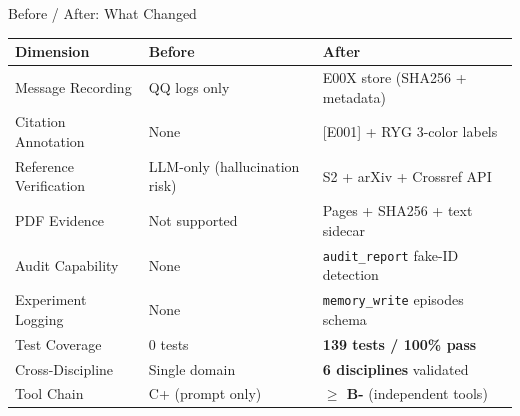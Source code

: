 \documentclass[aspectratio=169,11pt]{beamer}
\begin{document}
\begin{frame}{Before / After: What Changed}
  \begin{table}[h]
    \small
    \begin{tabular}{p{3.5cm}p{4.2cm}p{5.5cm}}
      \toprule
      Dimension & Before & After \\
      \midrule
      Message Recording & QQ logs only & E00X store (SHA256 + metadata) \\
      Citation Annotation & None & [E001] + RYG 3-color labels \\
      Reference Verification & LLM-only (hallucination risk) & S2 + arXiv + Crossref API \\
      PDF Evidence & Not supported & Pages + SHA256 + text sidecar \\
      Audit Capability & None & \texttt{audit\_report} fake-ID detection \\
      Experiment Logging & None & \texttt{memory\_write} episodes schema \\
      Test Coverage & 0 tests & \textbf{139 tests / 100\% pass} \\
      Cross-Discipline & Single domain & \textbf{6 disciplines} validated \\
      Tool Chain & C+ (prompt only) & \textbf{$\ge$ B-} (independent tools) \\
      \bottomrule
    \end{tabular}
  \end{table}
\end{frame}
\end{document}
